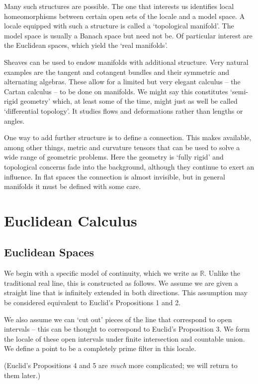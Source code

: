 \documentclass[oneside,english]{amsbook}
\numberwithin{section}{chapter}
\theoremstyle{plain}
\theoremstyle{definition}
\begin{document}
Many such structures are possible. The one that interests us identifies local homeomorphisms between certain open sets of the locale and a model space. A locale equipped with such a structure is called a `topological manifold'. The model space is usually a Banach space but need not be. Of particular interest are the Euclidean spaces, which yield the `real manifolds'.

Sheaves can be used to endow manifolds with additional structure. Very natural examples are the tangent and cotangent bundles and their symmetric and alternating algebras. These allow for a limited but very elegant calculus -- the Cartan calculus -- to be done on manifolds. We might say this constitutes `semi-rigid geometry' which, at least some of the time, might just as well be called `differential topology'. It studies flows and deformations rather than lengths or angles.

One way to add further structure is to define a connection. This makes available, among other things, metric and curvature tensors that can be used to solve a wide range of geometric problems. Here the geometry is `fully rigid' and topological concerns fade into the background, although they continue to exert an influence. In flat spaces the connection is almost invisible, but in general manifolds it must be defined with some care.

\section{Euclidean Calculus}

\subsection{Euclidean Spaces}

We begin with a specific model of continuity, which we write as $\mathbb{R}$. Unlike the traditional real line, this is constructed as follows. We assume we are given a straight line that is infinitely extended in both directions. This assumption may be considered equivalent to Euclid's Propositions 1 and 2. 

We also assume we can `cut out' pieces of the line that correspond to open intervals -- this can be thought to correspond to Euclid's Proposition 3. We form the locale of these open intervals under finite intersection and countable union. We define a point to be a completely prime filter in this locale. 

(Euclid's Propositions 4 and 5 are \emph{much} more complicated; we will return to them later.)
\end{document}
